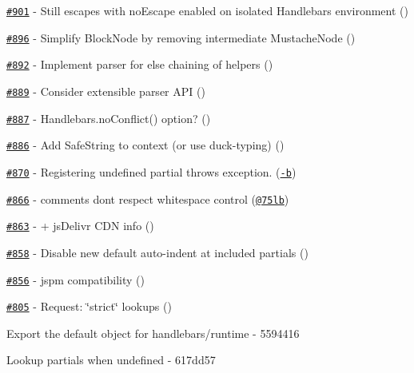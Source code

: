 \begin{DoxyItemize}
\item \href{https://github.com/wycats/handlebars.js/issues/901}{\tt \#901} -\/ Still escapes with no\+Escape enabled on isolated Handlebars environment (\href{https://api.github.com/users/zedknight}{\tt })
\item \href{https://github.com/wycats/handlebars.js/pull/896}{\tt \#896} -\/ Simplify Block\+Node by removing intermediate Mustache\+Node (\href{https://api.github.com/users/mmun}{\tt })
\item \href{https://github.com/wycats/handlebars.js/pull/892}{\tt \#892} -\/ Implement parser for else chaining of helpers (\href{https://api.github.com/users/kpdecker}{\tt })
\item \href{https://github.com/wycats/handlebars.js/issues/889}{\tt \#889} -\/ Consider extensible parser A\+P\+I (\href{https://api.github.com/users/kpdecker}{\tt })
\item \href{https://github.com/wycats/handlebars.js/issues/887}{\tt \#887} -\/ Handlebars.\+no\+Conflict() option? (\href{https://api.github.com/users/bradvogel}{\tt })
\item \href{https://github.com/wycats/handlebars.js/issues/886}{\tt \#886} -\/ Add Safe\+String to context (or use duck-\/typing) (\href{https://api.github.com/users/dominicbarnes}{\tt })
\item \href{https://github.com/wycats/handlebars.js/pull/870}{\tt \#870} -\/ Registering undefined partial throws exception. (\href{https://api.github.com/users/max-b}{\tt -\/b})
\item \href{https://github.com/wycats/handlebars.js/issues/866}{\tt \#866} -\/ comments don\textquotesingle{}t respect whitespace control (\href{https://api.github.com/users/75lb}{\tt @75lb})
\item \href{https://github.com/wycats/handlebars.js/pull/863}{\tt \#863} -\/ + js\+Delivr C\+D\+N info (\href{https://api.github.com/users/tomByrer}{\tt })
\item \href{https://github.com/wycats/handlebars.js/issues/858}{\tt \#858} -\/ Disable new default auto-\/indent at included partials (\href{https://api.github.com/users/majodev}{\tt })
\item \href{https://github.com/wycats/handlebars.js/pull/856}{\tt \#856} -\/ jspm compatibility (\href{https://api.github.com/users/MajorBreakfast}{\tt })
\item \href{https://github.com/wycats/handlebars.js/issues/805}{\tt \#805} -\/ Request\+: \char`\"{}strict\char`\"{} lookups (\href{https://api.github.com/users/nzakas}{\tt })
\item Export the default object for handlebars/runtime -\/ 5594416
\item Lookup partials when undefined -\/ 617dd57
\end{DoxyItemize}

